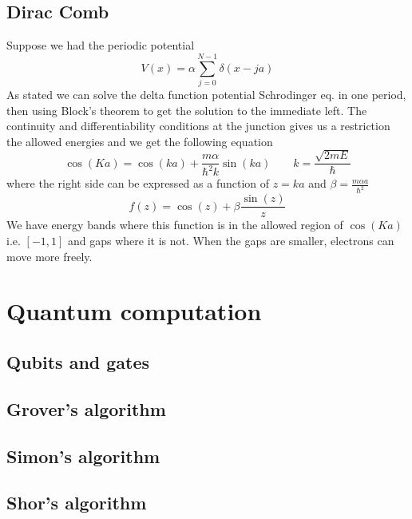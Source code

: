 \documentclass{article}
\begin{document}
\subsection{Dirac Comb}
Suppose we had the periodic potential $$V(x) = \alpha\sum_{j=0}^{N-1}\delta(x-ja)$$
As stated we can solve the delta function potential Schrodinger eq. in one period, then using Block's theorem to get the solution to the immediate left. The continuity and differentiability conditions at the junction gives us a restriction  the allowed energies and we get the following equation
$$\cos(Ka)=\cos(ka) + \frac{m\alpha}{\hbar^2k} \sin(ka) \qquad k=\frac{\sqrt{2mE}}{\hbar}$$
where the right side can be expressed as a function of $z=ka$ and $\beta = \frac{m\alpha a}{\hbar^2}$
$$f(z)=\cos(z)+\beta\frac{\sin(z)}{z}$$
We have energy bands where this function is in the allowed region of $\cos(Ka)$ i.e. $[-1,1]$ and gaps where it is not. When the gaps are smaller, electrons can move more freely.
\section{Quantum computation}
\subsection{Qubits and gates}
\subsection{Grover's algorithm}
\subsection{Simon's algorithm}
\subsection{Shor's algorithm}
\end{document}
